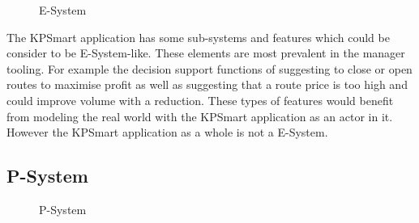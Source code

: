 \documentclass{style/CRPITStyle}
\begin{document}
\vspace{.1in}

\begin{figure}[htb]
\caption{\protect\label{e-system}  E-System }
\end{figure}

The KPSmart application has some sub-systems and features which could
be consider to be E-System-like. These elements are most prevalent in
the manager tooling. For example the decision support functions of suggesting
to close or open routes to maximise profit as well as suggesting that a route 
price is too high and could improve volume with a reduction. These types of
features would benefit from modeling the real world with the KPSmart application
as an actor in it. However the KPSmart application as a whole is not a E-System.

\vspace{.1in}

\subsection{P-System}

\vspace{.1in}

\begin{figure}[htb]
\caption{\protect\label{p-system}  P-System }
\end{figure}
\end{document}
